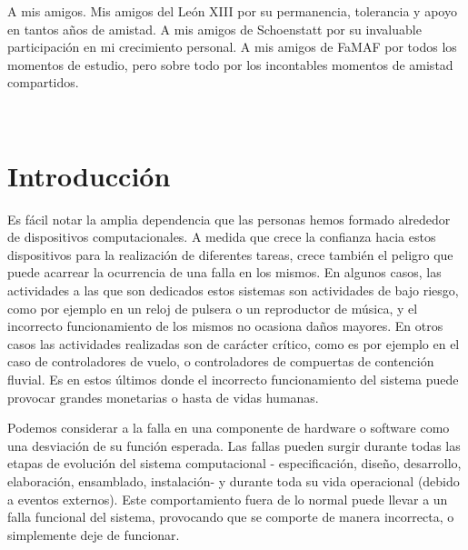 \documentclass[pdftex,a4paper,12pt]{book}
\begin{document}
A mis amigos. Mis amigos del Le\'on XIII por su permanencia, tolerancia y apoyo en tantos a\~nos de amistad. A mis amigos de Schoenstatt por su invaluable participaci\'on en mi crecimiento personal. A mis amigos de FaMAF por todos los momentos de estudio, pero sobre todo por los incontables momentos de amistad compartidos.







\newpage
~\\
\newpage
\tableofcontents




\newpage


\chapter{Introducci\'on}
\label{introduccion}

Es f\'acil notar la amplia dependencia que las personas hemos formado alrededor de dispositivos computacionales. A medida que crece la confianza hacia estos dispositivos para la realizaci\'on de diferentes tareas, crece tambi\'en el peligro que puede acarrear la ocurrencia de una falla en los mismos. En algunos casos, las actividades a las que son dedicados estos sistemas son actividades de bajo riesgo, como por ejemplo en un reloj de pulsera o un reproductor de m\'usica, y el incorrecto funcionamiento de los mismos no ocasiona da\~nos mayores. En otros casos las actividades realizadas son de car\'acter cr\'itico, como es por ejemplo en el caso de controladores de vuelo, o controladores de compuertas de contenci\'on fluvial. Es en estos \'ultimos donde el incorrecto funcionamiento del sistema puede provocar grandes monetarias o hasta de vidas humanas.

Podemos considerar a la falla en una componente de hardware o software como una desviaci\'on de su funci\'on esperada. Las fallas pueden surgir durante todas las etapas de evoluci\'on del sistema computacional - especificaci\'on, dise\~no, desarrollo, elaboraci\'on, ensamblado, instalaci\'on- y durante toda su vida operacional \cite{FaultInject} (debido a eventos externos). Este comportamiento fuera de lo normal puede llevar a un falla funcional del sistema, provocando que se comporte de manera incorrecta, o simplemente deje de funcionar.
\end{document}
